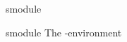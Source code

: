 \documentclass{stex}
\begin{document}
  \begin{smodule}[title=The \texttt{smodule}-Environment]{smodule}
  \begin{senv}{smodule}
     The \denv-environment
  \end{senv}
  \end{smodule}
\end{document}
